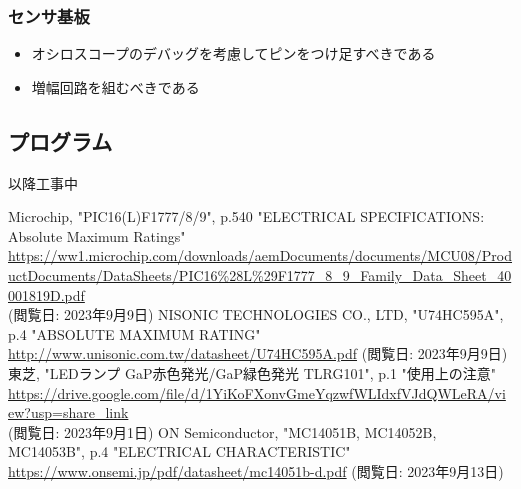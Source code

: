 \documentclass[a4paper]{ltjsarticle}
\begin{document}
\subsubsection{センサ基板}
\begin{itemize}
  \item オシロスコープのデバッグを考慮してピンをつけ足すべきである
  \item 増幅回路を組むべきである
\end{itemize}
\subsection{プログラム}
以降工事中

\begin{thebibliography}{200}
  Microchip, "PIC16(L)F1777/8/9", p.540 "ELECTRICAL SPECIFICATIONS: Absolute Maximum Ratings" \\ \url{https://ww1.microchip.com/downloads/aemDocuments/documents/MCU08/ProductDocuments/DataSheets/PIC16%28L%29F1777_8_9_Family_Data_Sheet_40001819D.pdf} \\ (閲覧日: 2023年9月9日)
  NISONIC TECHNOLOGIES CO., LTD, "U74HC595A", p.4 "ABSOLUTE MAXIMUM RATING"  \\ \url{http://www.unisonic.com.tw/datasheet/U74HC595A.pdf} (閲覧日: 2023年9月9日)
  東芝, "LEDランプ GaP赤色発光/GaP緑色発光 TLRG101", p.1 "使用上の注意" \\ \url{https://drive.google.com/file/d/1YiKoFXonvGmeYqzwfWLIdxfVJdQWLeRA/view?usp=share_link} \\ (閲覧日: 2023年9月1日)
  ON Semiconductor, "MC14051B, MC14052B, MC14053B", p.4 "ELECTRICAL CHARACTERISTIC" \\ \url{https://www.onsemi.jp/pdf/datasheet/mc14051b-d.pdf} (閲覧日: 2023年9月13日)
\end{thebibliography}

\end{document}
